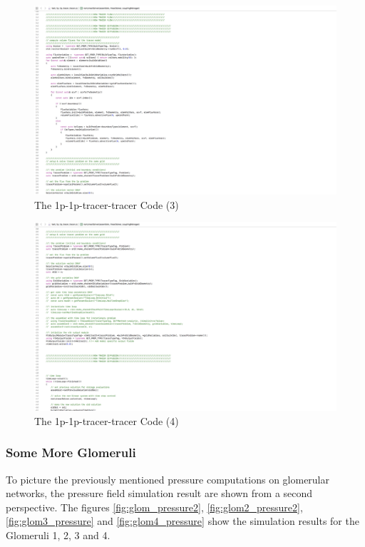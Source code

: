 \begin{figure}[h]
\centering
\includegraphics[width=350mm]{1p_1p_tracer_tracer_3}
\caption{\footnotesize The 1p-1p-tracer-tracer Code (3)}
\label{fig:1p-1p-tracer-tracer-3}
\end{figure}
\begin{figure}[h]
\centering
\includegraphics[width=350mm]{1p_1p_tracer_tracer_4}
\caption{\footnotesize The 1p-1p-tracer-tracer Code (4)}
\label{fig:1p-1p-tracer-tracer-4}
\end{figure}

\subsubsection*{Some More Glomeruli}
\label{SomeMoreGlomeruli}

To picture the previously mentioned pressure computations on glomerular networks, the pressure field simulation result are shown from a second perspective. The figures \ref{fig:glom_pressure2}, \ref{fig:glom2_pressure2}, \ref{fig:glom3_pressure} and \ref{fig:glom4_pressure} show the simulation results for the Glomeruli 1, 2, 3 and 4.

